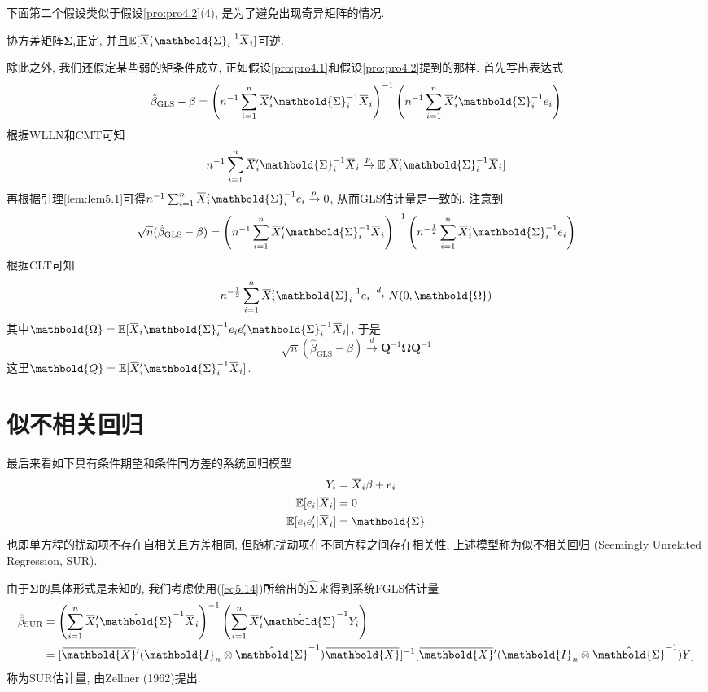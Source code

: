 \documentclass[cn, 12pt, math=mtpro2, bibstyle=apa, blue, twocol]{elegantbook}
\newcommand{\E}{\mathbb{E}}
\newcommand{\Q}{\mathbold{Q}}
\newcommand{\X}{\mathbold{X}}
\newcommand{\hb}{\hat{\beta}}
\newcommand{\OX}{\overbar{X}}
\newcommand{\BS}{\mathbold{\Sigma}}
\newcommand{\BO}{\mathbold{\Omega}}
\newcommand{\overbar}[1]{\mkern 1.5mu\overline{\mkern-1.5mu#1\mkern-1.5mu}\mkern 1.5mu}
\begin{document}
下面第二个假设类似于假设\ref{pro:pro4.2}(4), 是为了避免出现奇异矩阵的情况.
\begin{proposition}\label{pro:pro5.2}
协方差矩阵$\mathbold{\Sigma}_i$正定, 并且$\E[\overbar{X}_i'\mathbold{\Sigma}_i^{-1}\overbar{X}_i]$可逆.
\end{proposition}
除此之外, 我们还假定某些弱的矩条件成立, 正如假设\ref{pro:pro4.1}和假设\ref{pro:pro4.2}提到的那样. 首先写出表达式
$$\hb_{\text{GLS}}-\beta=\left(n^{-1}\sum_{i=1}^{n}\OX_i'\BS_i^{-1}\OX_i\right)^{-1}\left(n^{-1}\sum_{i=1}^{n}\OX_i'\BS_i^{-1}e_i\right)$$
根据WLLN和CMT可知
$$n^{-1}\sum_{i=1}^{n}\OX_i'\BS_i^{-1}\OX_i\xrightarrow{p}\E[\OX_i'\BS_i^{-1}\OX_i]$$
再根据引理\ref{lem:lem5.1}可得$n^{-1}\sum_{i=1}^{n}\OX_i'\BS_i^{-1}e_i\xrightarrow{p}0$, 从而GLS估计量是一致的. 注意到
$$\sqrt{n}(\hb_{\text{GLS}}-\beta)=\left(n^{-1}\sum_{i=1}^{n}\OX_i'\BS_i^{-1}\OX_i\right)^{-1}\left(n^{-\frac{1}{2}}\sum_{i=1}^{n}\OX_i'\BS_i^{-1}e_i\right)$$
根据CLT可知
$$n^{-\frac{1}{2}}\sum_{i=1}^{n}\OX_i'\BS_i^{-1}e_i\xrightarrow{d} N(0,\BO)$$
其中$\BO=\E[\OX_i\BS_i^{-1}e_ie_i'\BS_i^{-1}\OX_i]$, 于是
$$\sqrt{n}(\hb_{\text{GLS}}-\beta)\xrightarrow{d} \mathbold{Q}^{-1}\BO\mathbold{Q}^{-1}$$
这里$\Q=\E[\OX_i'\BS_i^{-1}\OX_i]$.
\section{似不相关回归}
最后来看如下具有条件期望和条件同方差的系统回归模型
\begin{align}
Y_i&=\overbar{X}_i\beta+e_i \label{eq5.11} \\
\E[e_i|\OX_i]&=0 \nonumber \\
\E[e_ie_i'|\OX_i]&=\mathbold{\Sigma} \nonumber
\end{align}
也即单方程的扰动项不存在自相关且方差相同, 但随机扰动项在不同方程之间存在相关性, 上述模型称为似不相关回归 (Seemingly Unrelated Regression, SUR).

由于$\mathbold{\Sigma}$的具体形式是未知的, 我们考虑使用(\ref{eq5.14})所给出的$\hat{\mathbold{\Sigma}}$来得到系统FGLS估计量
\begin{align}
\begin{split}
\hat{\beta}_{\text{SUR}}&=\left(\sum_{i=1}^{n}\overbar{X}_i'\hat{\mathbold{\Sigma}}^{-1}\overbar{X}_i\right)^{-1}\left(\sum_{i=1}^{n}\overbar{X}_i'\hat{\mathbold{\Sigma}}^{-1}Y_i\right) \\
&=[\overbar{\X}'(\mathbold{I}_n\otimes\hat{\mathbold{\Sigma}}^{-1})\overbar{\X}]^{-1}[\overbar{\X}'(\mathbold{I}_n\otimes\hat{\mathbold{\Sigma}}^{-1})Y]
\end{split}
\label{eq5.15}
\end{align}
称为SUR估计量, 由Zellner (1962)提出.
\end{document}
